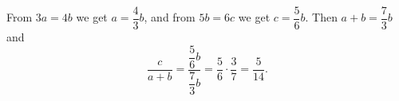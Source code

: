 From $3a=4b$ we get $a=\dfrac{4}{3}b$, and from $5b=6c$ we get $c=\dfrac{5}{6}b$. Then $a+b=\dfrac{7}{3}b$ and
\[
\dfrac{c}{a+b}=\dfrac{\dfrac{5}{6}b}{\dfrac{7}{3}b}=\dfrac{5}{6}\cdot\dfrac{3}{7}=\boxed{\dfrac{5}{14}} .
\]
